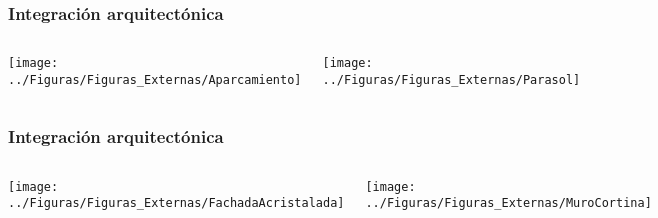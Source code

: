 \documentclass[serif, xcolor=dvipsnames]{beamer}
\begin{document}
\begin{frame}
  \frametitle{Integración arquitectónica}
  \begin{columns}[c]%


    \column{6cm}

    \texttt{[image: ../Figuras/Figuras\_Externas/Aparcamiento]}


    \column{4cm}

    \texttt{[image: ../Figuras/Figuras\_Externas/Parasol]}

  \end{columns}%

\end{frame}
\begin{frame}
  \frametitle{Integración arquitectónica}
  \begin{columns}[c]%


    \column{6cm}

    \texttt{[image: ../Figuras/Figuras\_Externas/FachadaAcristalada]}


    \column{4cm}

    \texttt{[image: ../Figuras/Figuras\_Externas/MuroCortina]}

  \end{columns}%

\end{frame}
\end{document}
